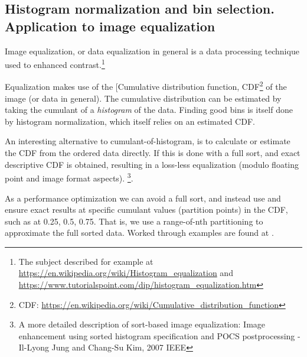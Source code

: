 \enlargethispage*{-5em}
\subsection{Histogram normalization and bin selection. Application to image equalization}

Image equalization, or data equalization in general is a data processing technique used to enhanced contrast.\footnote{
The subject described for example at \url{https://en.wikipedia.org/wiki/Histogram_equalization} and \url{https://www.tutorialspoint.com/dip/histogram_equalization.htm}}

Equalization makes use of the [Cumulative distribution function, CDF\footnote{CDF: \url{https://en.wikipedia.org/wiki/Cumulative_distribution_function}} of the image (or data in general). The cumulative distribution can be estimated by taking the cumulant of a \emph{histogram} of the data. Finding good bins is itself done by histogram normalization, which itself relies on an estimated CDF.

An interesting alternative to cumulant-of-histogram, is to calculate or estimate the CDF from the ordered data directly. If this is done with a full sort, and exact descriptive CDF is obtained, resulting in a loss-less equalization (modulo floating point and image format aspects).%
\footnote{A more detailed description of sort-based image equalization: Image enhancement using sorted histogram specification and POCS postprocessing -
Il-Lyong Jung and Chang-Su Kim, 2007 IEEE}.

As a performance optimization we can avoid a full sort, and instead use  and ensure exact results at specific cumulant values (partition points) in the CDF, such as at 0.25, 0.5, 0.75. That is, we use a range-of-nth partitioning to approximate the full sorted data. Worked through examples are found at \cite{p2375RefImpl}.

